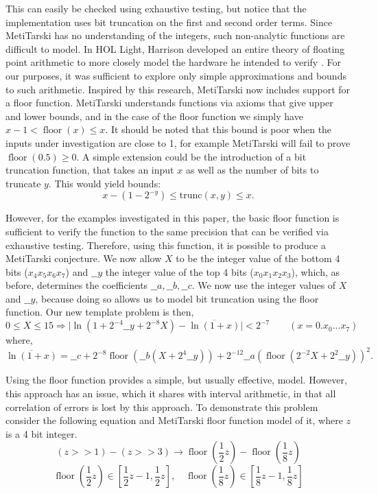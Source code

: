 \documentclass{fac}
\newcommand{\abs}[1]{\lvert#1\rvert}
\newcommand{\floor}{\mathop{\textrm{floor}}\nolimits}
\begin{document}
This can easily be checked using exhaustive testing, but notice that the implementation uses bit truncation on the first and second order terms. Since MetiTarski has no understanding of the integers, such non-analytic functions are difficult to model. In HOL Light, Harrison developed an entire theory of floating point arithmetic to more closely model the hardware he intended to verify \cite{harrison1999machine}. For our purposes, it was sufficient to explore only simple approximations and bounds to such arithmetic. Inspired by this research, MetiTarski now includes support for a floor function. MetiTarski understands functions via axioms that give upper and lower bounds, and in the case of the floor function we simply have $x-1< \floor(x)\le x$. It should be noted that this bound is poor when the inputs under investigation are close to 1, for example MetiTarski will fail to prove $\floor(0.5)\geq 0$. A simple extension could be the introduction of a bit truncation function, that takes an input $x$ as well as the number of bits to truncate $y$. This would yield bounds:
\begin{equation}
    x - (1-2^{-y}) \leq \textrm{trunc}(x,y)\leq x.
\label{trunc_bound}
\end{equation}

However, for the examples investigated in this paper, the basic floor function is sufficient to verify the function to the same precision that can be verified via exhaustive testing. Therefore, using this function, it is possible to produce a MetiTarski conjecture. We now allow $X$ to be the integer value of the bottom 4 bits ($x_4x_5x_6x_7$) and $\_\_y$ the integer value of the top 4 bits ($x_0x_1x_2x_3$), which, as before, determines the coefficients $\_\_a, \_\_b, \_\_c$. We now use the integer values of $X$ and $\_\_y$, because doing so allows us to model bit truncation using the floor function. Our new template problem is then, 
\[
0\le X \le 15 \Rightarrow \abs{\ln(1+2^{-4}\_\_y+2^{-8}X) - \overline{\ln(1+x)}} <2^{-7} \qquad (x= 0.x_0...x_7)
\]
where,
\[
\overline{\ln(1+x)}=\_\_c+2^{-8}\floor(\_\_b(X+2^{4}\_\_y))+2^{-12}\_\_a(\floor(2^{-2}X+2^{2}\_\_y))^2.
\]

Using the floor function provides a simple, but usually effective, model. However, this approach has an issue, which it shares with interval arithmetic, in that all correlation of errors is lost by this approach. To demonstrate this problem consider the following equation and MetiTarski floor function model of it, where $z$ is a 4 bit integer.
\[
(z>>1) - (z>>3) \rightarrow  \floor(\frac{1}{2}z) - \floor(\frac{1}{8}z)
\]
\[
\floor(\frac{1}{2}z) \in [\frac{1}{2}z-1, \frac{1}{2}z], \quad \floor(\frac{1}{8}z) \in [\frac{1}{8}z-1,\frac{1}{8}z]
\]
\end{document}
